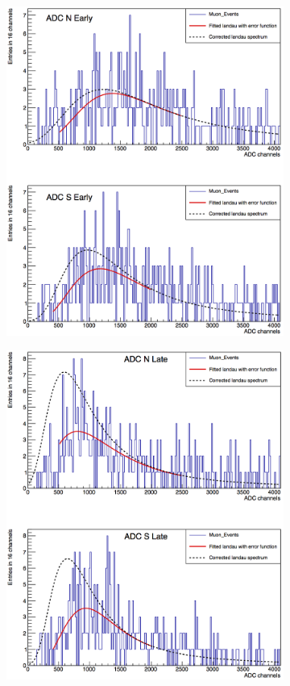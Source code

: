\begin{figure}[h!]
  \begin{subfigure}{0.5\linewidth}
    \includegraphics[width=\linewidth{}]{./fig/70M6CorrectedLandau.png}
  \end{subfigure}
  \begin{subfigure}{0.5\linewidth}
    \includegraphics[width=\linewidth{}]{./fig/124M6CorrectedLandau.png}

\end{subfigure}
\end{figure}
